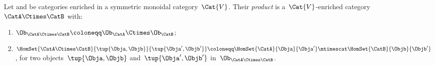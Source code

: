 \begin{definition}
    \label{def:prod_enrich_cat}
    Let \CatA and \CatB be categories enriched in a symmetric monoidal category~$\Cat{V}$.
    Their \emph{product} is a~$\Cat{V}$-enriched category~$\CatA\Ctimes \CatB$ with:
    \begin{enumerate}
        \item $\Ob_{\CatA\Ctimes \CatB}\coloneqq \Ob_\CatA \Ctimes \Ob_\CatB$;
        \item $\HomSet{\CatA\Ctimes \CatB}{\tup{\Obja,\Objb}}{\tup{\Obja',\Objb'}}\coloneqq \HomSet{\CatA}{\Obja}{\Obja'}\mtimescat \HomSet{\CatB}{\Objb}{\Objb'}$, for two objects~$\tup{\Obja,\Objb}$ and~$\tup{\Obja',\Objb'}$ in~$\Ob_{\CatA\Ctimes \CatB}$.
    \end{enumerate}
\end{definition}


